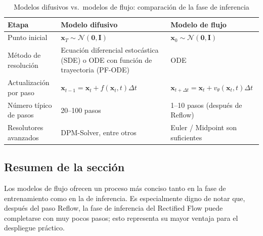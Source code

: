 \begin{table}[H]
\centering
\caption{Modelos difusivos vs.\ modelos de flujo: comparación de la fase de inferencia}
\begin{tabular}{@{} p{3.8cm} p{5cm} p{5cm} @{}}
\toprule
\textbf{Etapa} & \textbf{Modelo difusivo} & \textbf{Modelo de flujo} \\
\midrule
Punto inicial & $\mathbf{x}_T \sim \mathcal{N}(\mathbf{0},\mathbf{I})$ & $\mathbf{x}_0 \sim \mathcal{N}(\mathbf{0},\mathbf{I})$ \\
Método de resolución & Ecuación diferencial estocástica (SDE) o ODE con función de trayectoria (PF-ODE) & ODE \\
Actualización por paso & $\mathbf{x}_{t-1} = \mathbf{x}_t + f(\mathbf{x}_t,t)\Delta t$ & $\mathbf{x}_{t+\Delta t} = \mathbf{x}_t + v_\theta(\mathbf{x}_t,t)\Delta t$ \\
Número típico de pasos & 20--100 pasos & 1--10 pasos (después de Reflow) \\
Resolutores avanzados & DPM-Solver, entre otros & Euler / Midpoint son suficientes \\
\bottomrule
\end{tabular}
\end{table}

\subsection{Resumen de la sección}

Los modelos de flujo ofrecen un proceso más conciso tanto en la fase de entrenamiento como en la de inferencia. Es especialmente digno de notar que, después del paso Reflow, la fase de inferencia del Rectified Flow puede completarse con muy pocos pasos; esto representa su mayor ventaja para el despliegue práctico.
